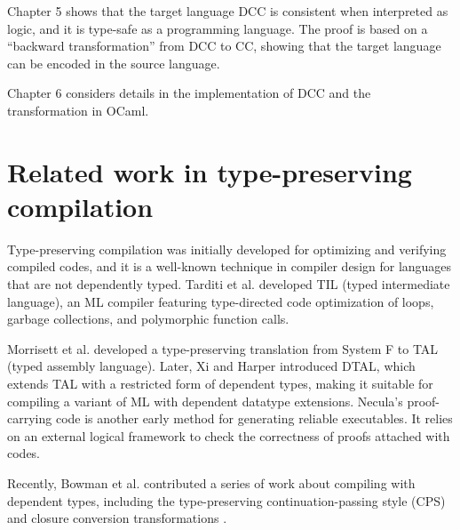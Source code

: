 Chapter 5 shows that the target language DCC is consistent when interpreted as logic, and it is type-safe as a programming language. The proof is based on a ``backward transformation'' from DCC to CC, showing that the target language can be encoded in the source language.

Chapter 6 considers details in the implementation of DCC and the transformation in OCaml.

\section{Related work in type-preserving \\compilation}

Type-preserving compilation was initially developed for optimizing and verifying compiled codes, and it is a well-known technique in compiler design for languages that are not dependently typed. Tarditi et al. \cite{tarditi1996til} developed TIL (typed intermediate language), an ML compiler featuring type-directed code optimization of loops, garbage collections, and polymorphic function calls. 

Morrisett et al. \cite{morrisett1999system} developed a type-preserving translation from System F to TAL (typed assembly language). Later, Xi and Harper \cite{xi2001dependently} introduced DTAL, which extends TAL with a restricted form of dependent types, making it suitable for compiling a variant of ML with dependent datatype extensions. Necula’s proof-carrying code \cite{necula1997proof} is another early method for generating reliable executables. It relies on an external logical framework to check the correctness of proofs attached with codes.

Recently, Bowman et al. contributed a series of work about compiling with dependent types, including the type-preserving continuation-passing style (CPS) and closure conversion transformations \cite{bowman2017type,bowman2018typed}.


